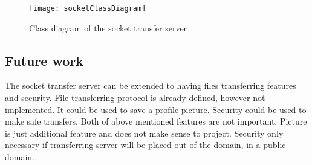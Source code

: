 \begin{figure}[h]
	\centering
		\texttt{[image: socketClassDiagram]}
	\caption{Class diagram of the socket transfer server}
	\label{fig:socketClassDiagram}
\end{figure}

\subsection{Future work}

The socket transfer server can be extended to having files transferring features and security. File transferring protocol is already defined, however not implemented. It could be used to save a profile picture. Security could be used to make safe transfers. Both of above mentioned features are not important. Picture is just additional feature and does not make sense to project. Security only necessary if transferring server will be placed out of the domain, in a public domain.